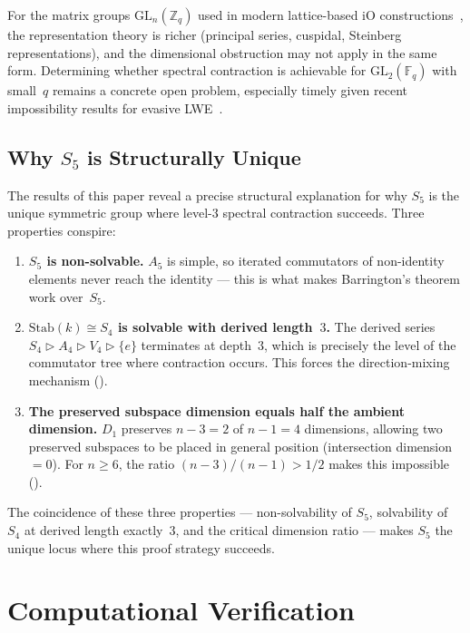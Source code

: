 \documentclass[11pt]{article}
\begin{document}
For the matrix groups $\mathrm{GL}_n(\mathbb{Z}_q)$ used in modern
lattice-based iO constructions~\cite{BDGM20,WW21,HJL25}, the
representation theory is richer (principal series, cuspidal, Steinberg
representations), and the dimensional obstruction may not apply in the
same form. Determining whether spectral contraction is achievable for
$\mathrm{GL}_2(\mathbb{F}_q)$ with small~$q$ remains a concrete open problem,
especially timely given recent impossibility results for evasive
LWE~\cite{DJMMV25}.


\subsection{Why $S_5$ is Structurally Unique}

The results of this paper reveal a precise structural explanation for
why $S_5$ is the unique symmetric group where level-$3$ spectral
contraction succeeds. Three properties conspire:

\begin{enumerate}[nosep]
\item \textbf{$S_5$ is non-solvable.} $A_5$ is simple, so iterated
  commutators of non-identity elements never reach the identity ---
  this is what makes Barrington's theorem work over~$S_5$.
\item \textbf{$\mathrm{Stab}(k) \cong S_4$ is solvable with derived
  length~$3$.} The derived series
  $S_4 \rhd A_4 \rhd V_4 \rhd \{e\}$ terminates at depth~$3$,
  which is precisely the level of the commutator tree where contraction
  occurs. This forces the direction-mixing mechanism ().
\item \textbf{The preserved subspace dimension equals half the ambient
  dimension.} $D_1$ preserves $n-3 = 2$ of $n-1 = 4$ dimensions,
  allowing two preserved subspaces to be placed in general position
  (intersection dimension $= 0$). For $n \geq 6$, the ratio
  $(n-3)/(n-1) > 1/2$ makes this impossible ().
\end{enumerate}

The coincidence of these three properties --- non-solvability of $S_5$,
solvability of $S_4$ at derived length exactly~$3$, and the critical
dimension ratio --- makes $S_5$ the unique locus where this proof strategy
succeeds.


\section{Computational Verification}
\label{sec:computation}
\end{document}
